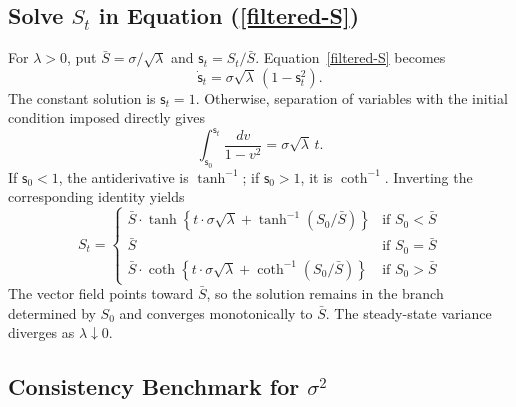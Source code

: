 \documentclass[mnsc]{informs3}
\begin{document}
\begin{APPENDICES}
\subsection{Solve $S_t$ in Equation (\ref{filtered-S})}\label{app-S-equ}

For $\lambda>0$, put $\bar S=\sigma/\sqrt\lambda$ and
$\mathsf s_t=S_t/\bar S$. Equation~\eqref{filtered-S} becomes
\[
\dot{\mathsf s}_t=\sigma\sqrt\lambda\,(1-\mathsf s_t^2).
\]
The constant solution is $\mathsf s_t=1$. Otherwise, separation of variables
with the initial condition imposed directly gives
\[
\int_{\mathsf s_0}^{\mathsf s_t}\frac{dv}{1-v^2}=\sigma\sqrt\lambda\,t.
\]
If $\mathsf s_0<1$, the antiderivative is $\tanh^{-1}$; if $\mathsf s_0>1$, it is
$\coth^{-1}$. Inverting the corresponding identity yields
\begin{equation*}
	S_t =
	\begin{cases}
        \bar{S} \cdot \tanh\left\{t\cdot\sigma\sqrt{\lambda} +  \tanh^{-1}\left(S_0\big/\bar{S}\right)\right\} & \text{if } S_0 < \bar{S} \\
        \bar{S} & \text{if } S_0 = \bar{S} \\
        \bar{S} \cdot \coth\left\{t\cdot\sigma\sqrt{\lambda} +  \coth^{-1}\left(S_0\big/\bar{S}\right)\right\} & \text{if } S_0 > \bar{S}
	\end{cases}
\end{equation*}
The vector field points toward $\bar S$, so the solution remains in the
branch determined by $S_0$ and converges monotonically to $\bar S$.
The steady-state variance diverges as $\lambda\downarrow0$.


\subsection{Consistency Benchmark for $\sigma^2$}\label{appexidx-normal-benchmark}


\end{APPENDICES}
\end{document}
